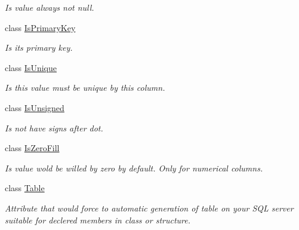 \begin{DoxyCompactItemize}
\begin{DoxyCompactList}\small\item\em Is value always not null. \end{DoxyCompactList}\item 
class \mbox{\hyperlink{class_uniform_data_operator_1_1_sql_1_1_tables_1_1_attributes_1_1_is_primary_key}{Is\+Primary\+Key}}
\begin{DoxyCompactList}\small\item\em Is it\textquotesingle{}s primary key. \end{DoxyCompactList}\item 
class \mbox{\hyperlink{class_uniform_data_operator_1_1_sql_1_1_tables_1_1_attributes_1_1_is_unique}{Is\+Unique}}
\begin{DoxyCompactList}\small\item\em Is this value must be unique by this column. \end{DoxyCompactList}\item 
class \mbox{\hyperlink{class_uniform_data_operator_1_1_sql_1_1_tables_1_1_attributes_1_1_is_unsigned}{Is\+Unsigned}}
\begin{DoxyCompactList}\small\item\em Is not have signs after dot. \end{DoxyCompactList}\item 
class \mbox{\hyperlink{class_uniform_data_operator_1_1_sql_1_1_tables_1_1_attributes_1_1_is_zero_fill}{Is\+Zero\+Fill}}
\begin{DoxyCompactList}\small\item\em Is value wold be willed by zero by default. Only for numerical columns. \end{DoxyCompactList}\item 
class \mbox{\hyperlink{class_uniform_data_operator_1_1_sql_1_1_tables_1_1_attributes_1_1_table}{Table}}
\begin{DoxyCompactList}\small\item\em Attribute that would force to automatic generation of table on your S\+QL server suitable for declered members in class or structure. \end{DoxyCompactList}\end{DoxyCompactItemize}
